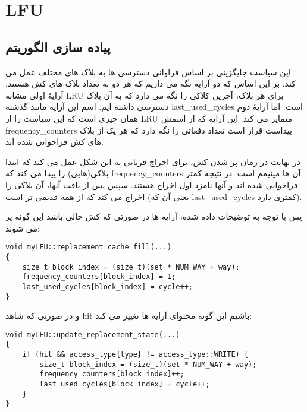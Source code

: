 \documentclass[17pt]{article}
\begin{document}
\section{LFU}
\subsection{پیاده سازی الگوریتم}
این سیاست جایگزینی بر اساس فراوانی دسترسی ها به بلاک های مختلف عمل می کند. بر این اساس که دو آرایه نگه می داریم که هر دو به تعداد بلاک های کش هستند. آرایهٔ اولی مشابه LRU برای هر بلاک، آخرین کلاکی را نگه می دارد که به آن بلاک دسترسی داشته ایم. اسم این آرایه  مانند گذشته last\_used\_cycles است. اما آرایهٔ دوم همان چیزی است که این سیاست را از LRU متمایز می کند. این آرایه که از اسمش frequency\_counters پیداست قرار است تعداد دفعاتی را نگه دارد که هر یک از بلاک های کش فراخوانی شده اند.

در نهایت در زمان پر شدن کش، برای اخراج قربانی به این شکل عمل می کند که ابتدا بلاکی(هایی) را پیدا می کند که frequency\_counters آن ها مینیمم است. در نتیجه کمتر فراخوانی شده اند و آنها نامزد اول اخراج هستند. سپس پس از یافت آنها، آن بلاکی را اخراج می کند که از همه قدیمی تر است (یعنی آن که last\_used\_cycles کمتری دارد).

پس با توجه به توضیحات داده شده، آرایه ها در صورتی که کش خالی باشد این گونه پر می شوند:

\begin{LTR}
\begin{lstlisting}
void myLFU::replacement_cache_fill(...)
{
    size_t block_index = (size_t)(set * NUM_WAY + way);
    frequency_counters[block_index] = 1;
    last_used_cycles[block_index] = cycle++;
}
\end{lstlisting}
\end{LTR}

و در صورتی که شاهد hit باشیم این گونه محتوای آرایه ها تغییر می کند:
\begin{LTR}
\begin{lstlisting}
void myLFU::update_replacement_state(...)
{
    if (hit && access_type{type} != access_type::WRITE) {
        size_t block_index = (size_t)(set * NUM_WAY + way);
        frequency_counters[block_index]++;
        last_used_cycles[block_index] = cycle++;
    }
}
\end{lstlisting}
\end{LTR}
\end{document}
